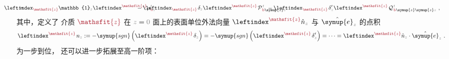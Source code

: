 \begin{subequations}
\begin{align}
	&= &&\hspace{-4.5em}\leftindex_{\textcolor{Maroon}{\mathsfit{z}}} {\mathbb{1}}_{\mathcolor{gray}{z}} \leftindex^{\textcolor{Maroon}{\mathsfit{z}}} {\rho}^{\;\!\mathcolor{gray}{t}}_{\;\!\textcolor{Maroon}{\text{b}}\mathcolor{gray}{z}} &&\hspace{-4.5em}- \leftindex_{\textcolor{Maroon}{\mathsfit{z}}} \;\! \delta_{\mathcolor{gray}{z}} \leftindex^{\textcolor{Maroon}{\mathsfit{z}}} \;\! {\mathcal{P}}^{\;\!\mathcolor{gray}{t}}_{\;\!\textcolor{Maroon}{\text{b}} \symup{z} \mathcolor{gray}{z}} &&\hspace{-4.5em}- \leftindex_{\textcolor{Maroon}{\mathsfit{z}}} \;\! \delta'_{\mathcolor{gray}{z}} \leftindex^{\textcolor{Maroon}{\mathsfit{z}}} \;\! {\mathcal{Q}}^{\;\!\mathcolor{gray}{t}}_{\;\!\textcolor{Maroon}{\text{b}} \symup{z} \symup{z} \mathcolor{gray}{z}} ~, \label{eq:p-b-01}
\end{align}
\end{subequations}
其中，定义了 介质 $\textcolor{Maroon}{\mathsfit{z}}$ 在 $\mathcolor{gray}{z} = \mathcolor{gray}{0}$ 面上的表面单位外法向量 $\leftindex^{\textcolor{Maroon}{\mathsfit{z}}} {\hat{n}}_{\mathcolor{gray}{z}}$ 与 $\hat{\symup{e}}_{\mathcolor{gray}{z}}$ 的点积
\begin{align} \label{eq:surf-normal-dot}
	\leftindex^{\textcolor{Maroon}{\mathsfit{z}}} \;\! n_{\mathcolor{gray}{z}} := - \symup{sgn} \left( \leftindex^{\textcolor{Maroon}{\mathsfit{z}}} \;\! \delta_{\mathcolor{gray}{z}} \right) = - \symup{sgn} \left( \leftindex^{\textcolor{Maroon}{\mathsfit{z}}} \;\! \delta'_{\mathcolor{gray}{z}} \right) = \cdots = \leftindex^{\textcolor{Maroon}{\mathsfit{z}}} {\hat{n}}_{\mathcolor{gray}{z}} \cdot \hat{\symup{e}}_{\mathcolor{gray}{z}}~.
\end{align}
为一步到位， 还可以进一步拓展至高一阶项：
